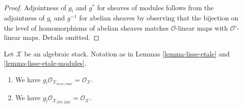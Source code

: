 \begin{proof}
\medskip\noindent
Adjointness of $g_!$ and $g^*$ for sheaves of modules follows from the
adjointness of $g_!$ and $g^{-1}$ for abelian sheaves by observing that
the bijection on the level of homomorphisms of abelian sheaves matches
$\mathcal{O}$-linear maps with $\mathcal{O}'$-linear maps. Details omitted.
\end{proof}

\begin{lemma}
\label{lemma-lisse-etale-structure-sheaf}
Let $\mathcal{X}$ be an algebraic stack. Notation as in
Lemmas \ref{lemma-lisse-etale} and \ref{lemma-lisse-etale-modules}.
\begin{enumerate}
\item We have $g_!\mathcal{O}_{\mathcal{X}_{lisse,\acute{e}tale}} =
\mathcal{O}_\mathcal{X}$.
\item We have $g_!\mathcal{O}_{\mathcal{X}_{flat, fppf}} =
\mathcal{O}_\mathcal{X}$.
\end{enumerate}
\end{lemma}

